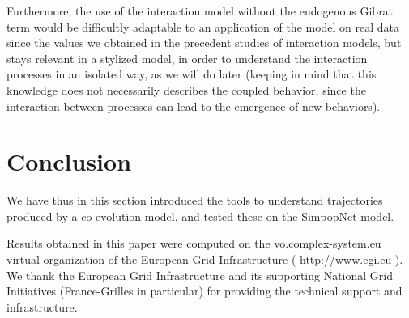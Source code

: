 Furthermore, the use of the interaction model without the endogenous Gibrat term would be difficultly adaptable to an application of the model on real data since the values we obtained in the precedent studies of interaction models, but stays relevant in a stylized model, in order to understand the interaction processes in an isolated way, as we will do later (keeping in mind that this knowledge does not necessarily describes the coupled behavior, since the interaction between processes can lead to the emergence of new behaviors).



\section{Conclusion}


We have thus in this section introduced the tools to understand trajectories produced by a co-evolution model, and tested these on the SimpopNet model.






%
\begin{acknowledgement}
Results obtained in this paper were computed on the vo.complex-system.eu virtual organization of the European Grid Infrastructure ( http://www.egi.eu ). We thank the European Grid Infrastructure and its supporting National Grid Initiatives (France-Grilles in particular) for providing the technical support and infrastructure.
\end{acknowledgement}


%
%

